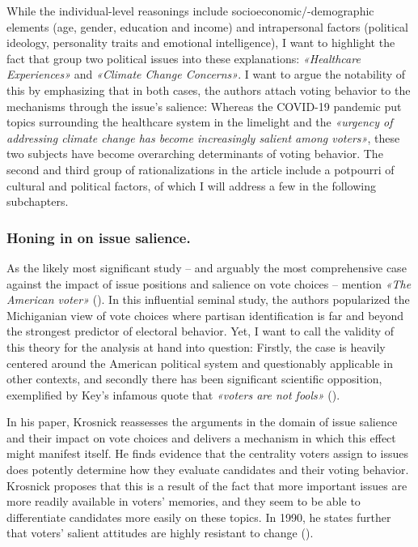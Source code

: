 \documentclass[11pt,a4paper]{article}
\begin{document}
While the individual-level reasonings include socioeconomic/-demographic elements (age, gender, education and income) and intrapersonal factors (political ideology, personality traits and emotional intelligence), I want to highlight the fact that \citeauthor{kulachai_factors_2023} group two political issues into these explanations: \textit{«Healthcare Experiences»} and \textit{«Climate Change Concerns»}. I want to argue the notability of this by emphasizing that in both cases, the authors attach voting behavior to the mechanisms through the issue’s salience: Whereas the COVID-19 pandemic put topics surrounding the healthcare system in the limelight and the \textit{«urgency of addressing climate change has become increasingly salient among voters»}, these two subjects have become overarching determinants of voting behavior. The second and third group of rationalizations in the article include a potpourri of cultural and political factors, of which I will address a few in the following subchapters.

\subsubsection{Honing in on issue salience.}
As the likely most significant study – and arguably the most comprehensive case against the impact of issue positions and salience on vote choices – \citeauthor{kulachai_factors_2023} mention \textit{«The American voter» }(\cite{campbell_american_1960}). In this influential seminal study, the authors popularized the Michiganian view of vote choices where partisan identification is far and beyond the strongest predictor of electoral behavior. Yet, I want to call the validity of this theory for the analysis at hand into question: Firstly, the case is heavily centered around the American political system and questionably applicable in other contexts, and secondly there has been significant scientific opposition, exemplified by Key’s infamous quote that \textit{«voters are not fools»} (\cite{key_responsible_1966}).

In his \citeyear{krosnick_role_1988} paper, Krosnick reassesses the arguments in the domain of issue salience and their impact on vote choices and delivers a mechanism in which this effect might manifest itself. He finds evidence that the centrality voters assign to issues does potently determine how they evaluate candidates and their voting behavior. Krosnick proposes that this is a result of the fact that more important issues are more readily available in voters’ memories, and they seem to be able to differentiate candidates more easily on these topics. In 1990, he states further that voters’ salient attitudes are highly resistant to change (\cite{krosnick_government_1990}).
\end{document}
